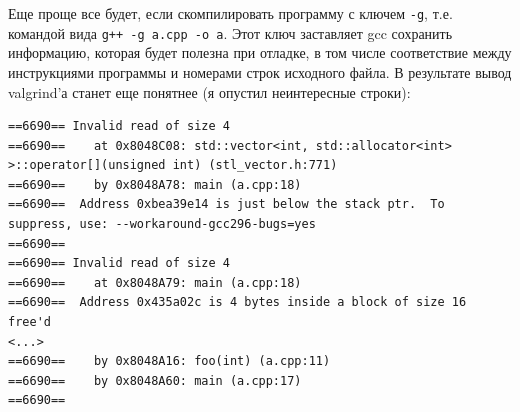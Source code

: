 \documentclass[a4paper,10pt]{problems}
\begin{document}
Еще проще все будет, если скомпилировать программу с ключем \verb`-g`, т.е. командой вида \verb`g++ -g a.cpp -o a`. 
Этот ключ заставляет gcc сохранить информацию, которая будет полезна при отладке, в том числе соответствие между инструкциями программы
и номерами строк исходного файла. В результате вывод valgrind'а станет еще понятнее (я опустил неинтересные строки):
\begin{verbatim}
==6690== Invalid read of size 4                                                                                                                                                                                                                                                
==6690==    at 0x8048C08: std::vector<int, std::allocator<int> >::operator[](unsigned int) (stl_vector.h:771)                                                                                                                                                                  
==6690==    by 0x8048A78: main (a.cpp:18)                                                                                                                                                                                                                                      
==6690==  Address 0xbea39e14 is just below the stack ptr.  To suppress, use: --workaround-gcc296-bugs=yes                                                                                                                                                                      
==6690==                                                                                                                                                                                                                                                                       
==6690== Invalid read of size 4                                                                                                                                                                                                                                                
==6690==    at 0x8048A79: main (a.cpp:18)                                                                                                                                                                                                                                      
==6690==  Address 0x435a02c is 4 bytes inside a block of size 16 free'd                                                                                                                                                                                                        
<...>
==6690==    by 0x8048A16: foo(int) (a.cpp:11)
==6690==    by 0x8048A60: main (a.cpp:17)
==6690== 
\end{verbatim}
\end{document}
